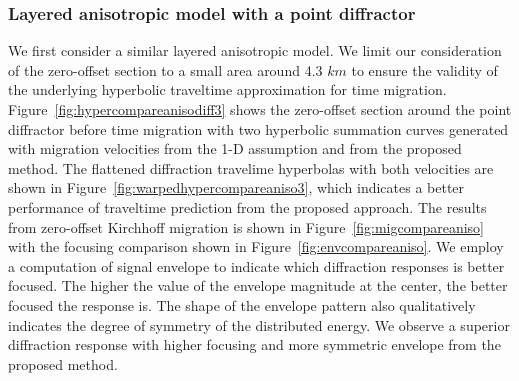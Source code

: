 \subsubsection{Layered anisotropic model with a point diffractor}




We first consider a similar layered anisotropic model. We limit our consideration of the zero-offset section to a small area around 4.3 $km$ to ensure the validity of the underlying hyperbolic traveltime approximation for time migration. Figure~\ref{fig:hypercompareanisodiff3} shows the zero-offset section around the point diffractor before time migration with two hyperbolic summation curves generated with migration velocities from the 1-D assumption and from the proposed method. The flattened diffraction travelime hyperbolas with both velocities are shown in Figure~\ref{fig:warpedhypercompareaniso3}, which indicates a better performance of traveltime prediction from the proposed approach. The results from zero-offset Kirchhoff migration is shown in Figure~\ref{fig:migcompareaniso} with the focusing comparison shown in Figure~\ref{fig:envcompareaniso}. We employ a computation of signal envelope to indicate which diffraction responses is better focused. The higher the value of the envelope magnitude at the center, the better focused the response is. The shape of the envelope pattern also qualitatively indicates the degree of symmetry of the distributed energy. We observe a superior diffraction response with higher focusing and more symmetric envelope from the proposed method.


